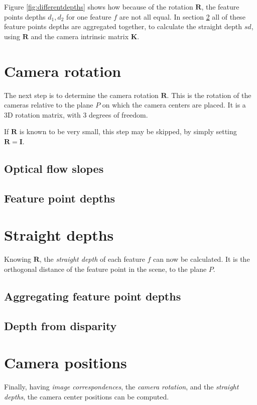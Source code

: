 \documentclass{scrreprt}
\newcommand{\matr}[1]{\mathbf{#1}}
\begin{document}
Figure \ref{fig:differentdepths} shows how because of the rotation $\matr{R}$, the feature points depths $d_1, d_2$ for one feature $f$ are not all equal. In section \ref{ref:straightdepths} all of these feature points depths are aggregated together, to calculate the straight depth $sd$, using $\matr{R}$ and the camera intrinsic matrix $\matr{K}$.






\section{Camera rotation}
\label{sec:camrotation}
The next step is to determine the camera rotation $\matr{R}$. This is the rotation of the cameras relative to the plane $P$ on which the camera centers are placed. It is a 3D rotation matrix, with 3 degrees of freedom.

If $\matr{R}$ is known to be very small, this step may be skipped, by simply setting $\matr{R} = \matr{I}$.


\subsection{Optical flow slopes}



\subsection{Feature point depths}




\section{Straight depths}
\label{ref:straightdepths}
Knowing $\matr{R}$, the \emph{straight depth} of each feature $f$ can now be calculated. It is the orthogonal distance of the feature point in the scene, to the plane $P$.
\subsection{Aggregating feature point depths}

\subsection{Depth from disparity}

\section{Camera positions}
Finally, having \emph{image correspondences}, the \emph{camera rotation}, and the \emph{straight depths}, the camera center positions can be computed.
\end{document}
